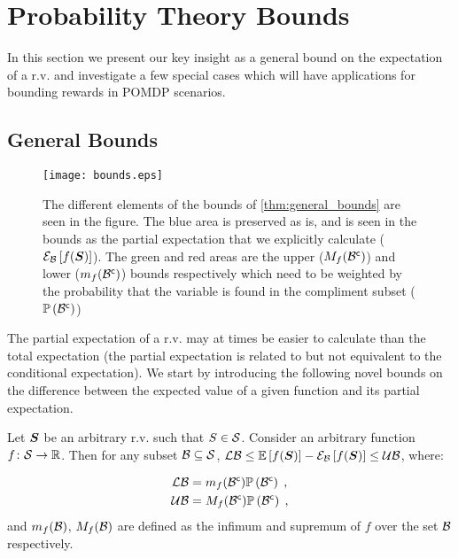\section{Probability Theory Bounds}\label{sec:bounds}

In this section we present our key insight as a general bound on the expectation of a r.v. and investigate a few special cases which will have applications for bounding rewards in POMDP scenarios.


\subsection{General Bounds}\label{sec:general_bounds}
\begin{figure}[h]
	\centering
	\texttt{[image: bounds.eps]}
	\caption{The different elements of the bounds of \cref{thm:general_bounds} are seen in the figure. The blue area is preserved as is, and is seen in the bounds as the partial expectation that we explicitly calculate ($\mathcal{E}_{\mathcal B}\left[{f(\boldsymbol S)}\right]$). The green and red areas are the upper ($M_f({\mathcal B}^{\mathsf{c}})$) and lower ($m_f({\mathcal B}^{\mathsf{c}})$) bounds respectively which need to be weighted by the probability that the variable is found in the compliment subset ($\mathbb{P}\left({{\mathcal B}^{\mathsf{c}}}\right)$)}
	\label{fig:general_bounds}
\end{figure}
The partial expectation of a r.v. may at times be easier to calculate than the total expectation (the partial expectation is related to but not equivalent to the conditional expectation). We start by introducing the following novel bounds on the difference between the expected value of a given function and its partial expectation.

\begin{theoremE}
	\label{thm:general_bounds}
	Let $\boldsymbol S$ be an arbitrary r.v. such that $S\in\mathcal S$. Consider an arbitrary function  $f\colon\mathcal S\to\mathbb{R}$. Then for any subset $\mathcal B\subseteq\mathcal S$, $\operatorname*{\mathcal{LB}}\leq\operatorname*{\mathbb{E}}\limits_{}\left[{f(\boldsymbol S)}\right]-\mathcal{E}_{\mathcal B}\left[{f(\boldsymbol S)}\right]\leq\operatorname*{\mathcal{UB}}$, where:
	\begin{subequations}
	\begin{align}
		\operatorname*{\mathcal{LB}} & = m_f({\mathcal B}^{\mathsf{c}})\mathbb{P}\left({{\mathcal B}^{\mathsf{c}}}\right)\;,\label{eq:bound_lower}
		\\
		\operatorname*{\mathcal{UB}} & = M_f({\mathcal B}^{\mathsf{c}})\mathbb{P}\left({{\mathcal B}^{\mathsf{c}}}\right)\;,
	\end{align}
	\end{subequations}
	and $m_f(\mathcal B)$, $M_f(\mathcal B)$ are defined as the infimum and supremum of $f$ over the set $\mathcal B$ respectively.
\end{theoremE}

